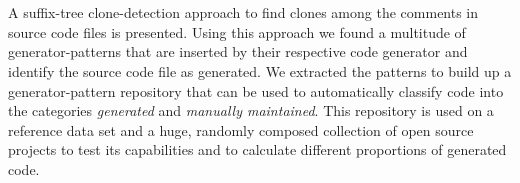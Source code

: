 \chapter{\abstractname}

A suffix-tree clone-detection approach to find clones among the comments in source code files is presented. Using this approach we found a multitude of generator-patterns that are inserted by their respective code generator and identify the source code file as generated. We extracted the patterns to build up a generator-pattern repository that can be used to automatically classify code into the categories \textit{generated} and \textit{manually maintained}. This repository is used on a reference data set and a huge, randomly composed collection of open source projects to test its capabilities and to calculate different proportions of generated code.